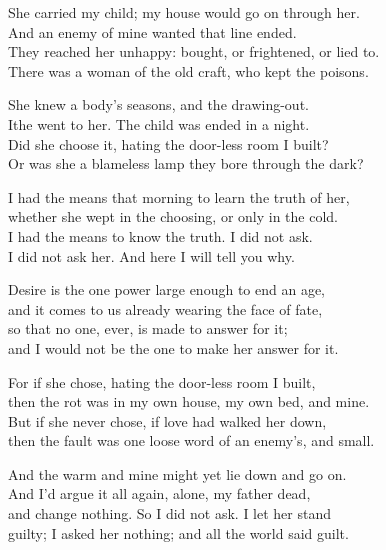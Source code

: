 \begin{founder}
She carried my child; my house would go on through her.\\
And an enemy of mine wanted that line ended.\\
They reached her unhappy: bought, or frightened, or lied to.\\
There was a woman of the old craft, who kept the poisons.\\
\medskip

She knew a body's seasons, and the drawing-out.\\
Ithe went to her. The child was ended in a night.\\
Did she choose it, hating the door-less room I built?\\
Or was she a blameless lamp they bore through the dark?\\
\medskip

I had the means that morning to learn the truth of her,\\
whether she wept in the choosing, or only in the cold.\\
I had the means to know the truth. I did not ask.\\
I did not ask her. And here I will tell you why.\\
\medskip

Desire is the one power large enough to end an age,\\
and it comes to us already wearing the face of fate,\\
so that no one, ever, is made to answer for it;\\
and I would not be the one to make her answer for it.\\
\medskip

For if she chose, hating the door-less room I built,\\
then the rot was in my own house, my own bed, and mine.\\
But if she never chose, if love had walked her down,\\
then the fault was one loose word of an enemy's, and small.\\
\medskip

And the warm and mine might yet lie down and go on.\\
And I'd argue it all again, alone, my father dead,\\
and change nothing. So I did not ask. I let her stand\\
guilty; I asked her nothing; and all the world said guilt.\\

\ornament


\end{founder}
